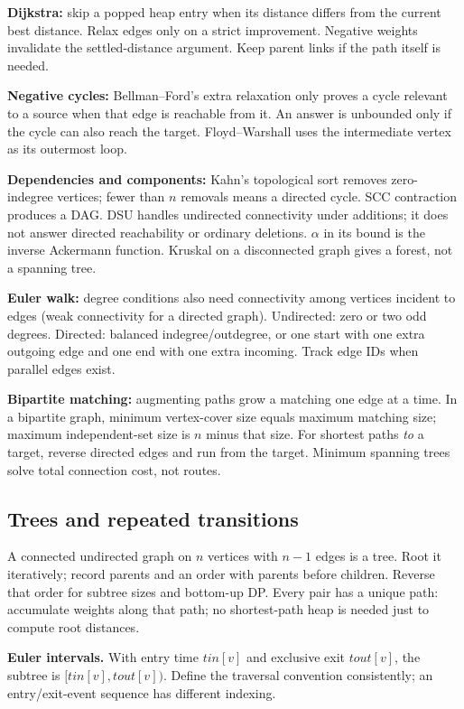 \textbf{Dijkstra:} skip a popped heap entry when its distance differs
from the current best distance. Relax edges only on a strict improvement.
Negative weights invalidate the settled-distance argument. Keep parent
links if the path itself is needed.

\textbf{Negative cycles:} Bellman--Ford's extra relaxation only proves
a cycle relevant to a source when that edge is reachable from it.
An answer is unbounded only if the cycle can also reach the target.
Floyd--Warshall uses the intermediate vertex as its outermost loop.

\textbf{Dependencies and components:} Kahn's topological sort removes
zero-indegree vertices; fewer than $n$ removals means a directed cycle.
SCC contraction produces a DAG. DSU handles undirected connectivity under
additions; it does not answer directed reachability or ordinary deletions.
$\alpha$ in its bound is the inverse Ackermann function. Kruskal on a
disconnected graph gives a forest, not a spanning tree.

\textbf{Euler walk:} degree conditions also need connectivity among
vertices incident to edges (weak connectivity for a directed graph).
Undirected: zero or two odd degrees. Directed: balanced indegree/outdegree,
or one start with one extra outgoing edge and one end with one extra incoming.
Track edge IDs when parallel edges exist.

\textbf{Bipartite matching:} augmenting paths grow a matching one edge at
a time. In a bipartite graph, minimum vertex-cover size equals maximum
matching size; maximum independent-set size is $n$ minus that size.
For shortest paths \emph{to} a target, reverse directed edges and run from
the target. Minimum spanning trees solve total connection cost, not routes.

\subsection{Trees and repeated transitions}\label{algo:trees}
A connected undirected graph on $n$ vertices with $n-1$ edges is a tree.
Root it iteratively; record parents and an order with parents before
children. Reverse that order for subtree sizes and bottom-up DP.
Every pair has a unique path: accumulate weights along that path; no
shortest-path heap is needed just to compute root distances.

\textbf{Euler intervals.} With entry time $tin[v]$ and exclusive exit
$tout[v]$, the subtree is $[tin[v],tout[v])$. Define the traversal convention
consistently; an entry/exit-event sequence has different indexing.

